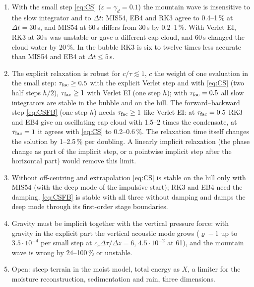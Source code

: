 \documentclass[11pt,a4paper]{article}
\newcommand{\dtau}{\Delta\tau}
\newcommand{\dt}{\Delta t}
\begin{document}
\begin{enumerate}
source, $\rho\theta_\rho$ is in flux form. The two spatial discretisations differ by 5--9\,\%; a resolution
study is needed to decide which is closer to the converged solution.
\item With the small step \eqref{eq:CS} ($\varepsilon=\gamma_d=0.1$) the mountain wave is insensitive to the slow integrator and to
$\dt$: MIS54, EB4 and RK3 agree to 0.4--1\,\% at $\dt=30$\,s, and MIS54 at 60\,s differs from 30\,s by 0.2--1\,\%.
With Verlet EI, RK3 at 30\,s was unstable or gave a different cap cloud, and 60\,s changed the cloud water by 20\,\%.
In the bubble RK3 is six to twelve times less accurate than MIS54 and EB4 at $\dt\le5$\,s.
\item The explicit relaxation is robust for $c/\tau\lesssim1$, $c$ the weight of one evaluation in the small step:
$\tau_{\rm fac}\ge0.5$ with the explicit Verlet step and with \eqref{eq:CS} (two half steps $h/2$), $\tau_{\rm fac}\ge1$ with Verlet EI
(one step $h$); with $\tau_{\rm fac}=0.5$ all slow integrators are stable in the bubble and on the hill.
The forward--backward step \eqref{eq:CSFB} (one step $h$) needs $\tau_{\rm fac}\ge1$ like Verlet EI: at $\tau_{\rm fac}=0.5$ RK3 and EB4 give
an oscillating cap cloud with 1.5--2 times the condensate, at $\tau_{\rm fac}=1$ it agrees with \eqref{eq:CS} to 0.2--0.6\,\%.
The relaxation time itself changes the solution by 1--2.5\,\% per doubling.
A linearly implicit relaxation (the phase change as part of the implicit step, or a pointwise implicit
step after the horizontal part) would remove this limit.
\item Without off-centring and extrapolation \eqref{eq:CS} is stable on the hill only with MIS54 (with the deep mode of
the impulsive start); RK3 and EB4 need the damping. \eqref{eq:CSFB} is stable with all three without damping and
damps the deep mode through its first-order stage boundaries.
\item Gravity must be implicit together with the vertical pressure force: with gravity in the explicit part the vertical
acoustic mode grows ($\varrho-1$ up to $3.5\cdot10^{-4}$ per small step at $c_s\dtau/\Delta z=6$, $4.5\cdot10^{-2}$ at 61), and the mountain wave is
wrong by 24--100\,\% or unstable.
\item Open: steep terrain in the moist model, total energy as $X$, a limiter for the moisture
reconstruction, sedimentation and rain, three dimensions.
\end{enumerate}

\appendix
\end{document}
